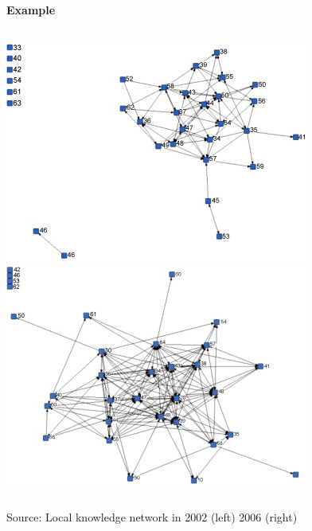\documentclass[8pt]{beamer}
\begin{document}

\begin{frame}
\frametitle{\insertsection}
\framesubtitle{Example}

\begin{columns}[c]
\includegraphics[height=0.4\textheight]{wine1}\\

\centering
\includegraphics[height=0.4\textheight]{wine2}\\
\end{columns}
\medskip
\medskip
\medskip
\centering
\tiny Source: Local knowledge network in 2002 (left) 2006 (right) \cite{Giuliani2013}
\end{frame}


\end{document}

